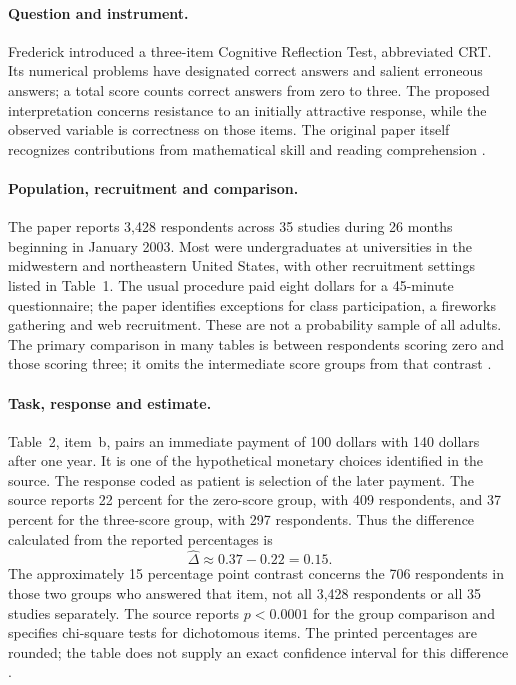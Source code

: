 \paragraph{Question and instrument.}
Frederick introduced a three-item Cognitive Reflection Test, abbreviated CRT.
Its numerical problems have designated correct answers and salient erroneous
answers; a total score counts correct answers from zero to three. The proposed
interpretation concerns resistance to an initially attractive response, while
the observed variable is correctness on those items. The original paper itself
recognizes contributions from mathematical skill and reading comprehension
\cite[pp.~26--28, 35]{Frederick2005CRT}.

\paragraph{Population, recruitment and comparison.}
The paper reports 3,428 respondents across 35 studies during 26 months beginning
in January 2003. Most were undergraduates at universities in the midwestern
and northeastern United States, with other recruitment settings listed in
Table~1. The usual procedure paid eight dollars for a 45-minute questionnaire;
the paper identifies exceptions for class participation, a fireworks gathering
and web recruitment. These are not a probability sample of all adults.
The primary comparison in many tables is between respondents scoring zero and
those scoring three; it omits the intermediate score groups from that contrast
\cite[pp.~28--29 and notes to table~1]{Frederick2005CRT}.

\paragraph{Task, response and estimate.}
Table~2, item~b, pairs an immediate payment of 100 dollars with 140 dollars
after one year. It is one of the hypothetical monetary choices identified in
the source. The response coded as patient is selection of the later payment.
The source reports 22 percent for the zero-score group, with 409 respondents,
and 37 percent for the three-score group, with 297 respondents. Thus the
difference calculated from the reported percentages is
\[
          \widehat\Delta\approx0.37-0.22=0.15.
\]
The approximately 15 percentage point contrast concerns the 706 respondents
in those two groups who answered that item, not all 3,428 respondents or all
35 studies separately. The source reports \(p<0.0001\) for the group
comparison and specifies chi-square tests for dichotomous items. The printed
percentages are rounded; the table does not supply an exact confidence interval
for this difference \cite[pp.~30--31, table~2b]{Frederick2005CRT}.

